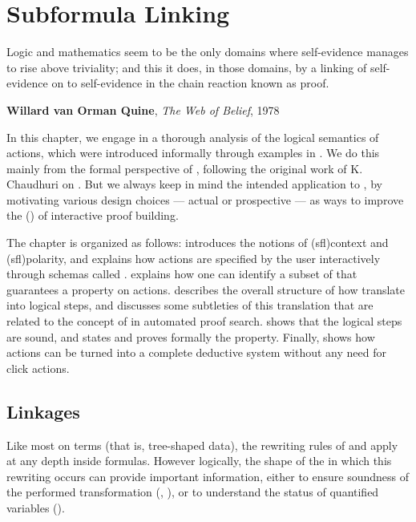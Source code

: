 \setchapterpreamble[u]{\margintoc}
\chapter{Subformula Linking}


\epigraph{Logic and mathematics seem to be the only domains where self-evidence
manages to rise above triviality; and this it does, in those domains, by a
linking of self-evidence on to self-evidence in the chain reaction known as
proof.}{\textbf{Willard van Orman Quine}, \textit{The Web of Belief}, 1978}

\AP
In this chapter, we engage in a thorough analysis of the logical semantics of
 actions, which were introduced informally through examples in
. We do this mainly from the formal perspective of  , following the original work of K. Chaudhuri on
\emph{} \cite{Chaudhuri2013}. But we always keep in mind
the intended application to , by motivating various design
choices --- actual or prospective --- as ways to improve the  () of interactive proof building.

The chapter is organized as follows:  introduces the notions of
\kl(sfl){context} and \kl(sfl){polarity}, and explains how  actions are
specified by the user interactively through schemas called \emph{}.
 explains how one can identify a subset of  that
guarantees a  property on  actions. 
describes the overall structure of how  translate into logical
steps, and  discusses some subtleties of this translation that
are related to the concept of \emph{} in automated proof search.
 shows that the logical steps are sound, and
 states and proves formally the  property.
Finally,  shows how  actions can be turned into
a complete deductive system without any need for click actions.

\section{Linkages}

Like most  on terms (that is, tree-shaped data), the
rewriting rules of  and  apply at any depth inside
formulas. However logically, the shape of the \emph{} in which this
rewriting occurs can provide important information, either to ensure soundness
of the performed transformation (, ),
or to understand the status of quantified variables ().

